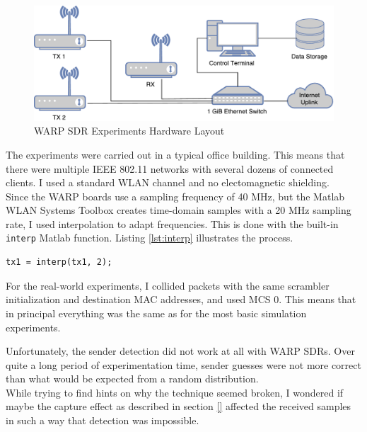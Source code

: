 \begin{figure}[H]
	\centering
	\includegraphics[width=\textwidth]{gfx/images/warp-layout}
	\caption{WARP SDR Experiments Hardware Layout}
	\label{fig:warp-layout}
\end{figure}

The experiments were carried out in a typical office building. This means that there were multiple IEEE 802.11 networks with several dozens of connected clients. I used a standard WLAN channel and no electomagnetic shielding.\\

Since the \gls{WARP} boards use a sampling frequency of 40 MHz, but the Matlab WLAN Systems Toolbox creates time-domain samples with a 20 MHz sampling rate, I used interpolation to adapt frequencies. This is done with the built-in \texttt{interp} Matlab function. Listing \ref{lst:interp} illustrates the process.

\begin{lstlisting}[captionpos=b,caption={Interpolate Sampling Rate},label=lst:interp]
% Interpolate to get from 20 to 40 MHz sampling rate
tx1 = interp(tx1, 2);
\end{lstlisting}

For the real-world experiments, I collided packets with the same scrambler initialization and destination MAC addresses, and used \gls{MCS} 0. This means that in principal everything was the same as for the most basic simulation experiments.

Unfortunately, the sender detection did not work at all with \gls{WARP} \glspl{SDR}. Over quite a long period of experimentation time, sender guesses were not more correct than what would be expected from a random distribution.\\

While trying to find hints on why the technique seemed broken, I wondered if maybe the capture effect as described in section \ref{} affected the received samples in such a way that detection was impossible.

